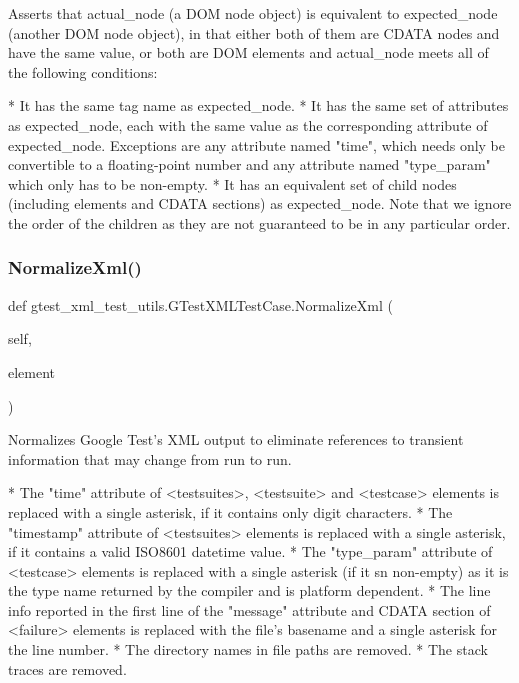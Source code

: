 \begin{DoxyVerb}Asserts that actual_node (a DOM node object) is equivalent to
expected_node (another DOM node object), in that either both of
them are CDATA nodes and have the same value, or both are DOM
elements and actual_node meets all of the following conditions:

*  It has the same tag name as expected_node.
*  It has the same set of attributes as expected_node, each with
   the same value as the corresponding attribute of expected_node.
   Exceptions are any attribute named "time", which needs only be
   convertible to a floating-point number and any attribute named
   "type_param" which only has to be non-empty.
*  It has an equivalent set of child nodes (including elements and
   CDATA sections) as expected_node.  Note that we ignore the
   order of the children as they are not guaranteed to be in any
   particular order.
\end{DoxyVerb}
 \mbox{\label{classgtest__xml__test__utils_1_1_g_test_x_m_l_test_case_ac4823e96c3b5327b25a340a3605447d9}} 
\subsubsection{\texorpdfstring{Normalize\+Xml()}{NormalizeXml()}}
{\footnotesize\ttfamily def gtest\+\_\+xml\+\_\+test\+\_\+utils.\+G\+Test\+X\+M\+L\+Test\+Case.\+Normalize\+Xml (\begin{DoxyParamCaption}\item[{}]{self,  }\item[{}]{element }\end{DoxyParamCaption})}

\begin{DoxyVerb}Normalizes Google Test's XML output to eliminate references to transient
information that may change from run to run.

*  The "time" attribute of <testsuites>, <testsuite> and <testcase>
   elements is replaced with a single asterisk, if it contains
   only digit characters.
*  The "timestamp" attribute of <testsuites> elements is replaced with a
   single asterisk, if it contains a valid ISO8601 datetime value.
*  The "type_param" attribute of <testcase> elements is replaced with a
   single asterisk (if it sn non-empty) as it is the type name returned
   by the compiler and is platform dependent.
*  The line info reported in the first line of the "message"
   attribute and CDATA section of <failure> elements is replaced with the
   file's basename and a single asterisk for the line number.
*  The directory names in file paths are removed.
*  The stack traces are removed.
\end{DoxyVerb}
 

